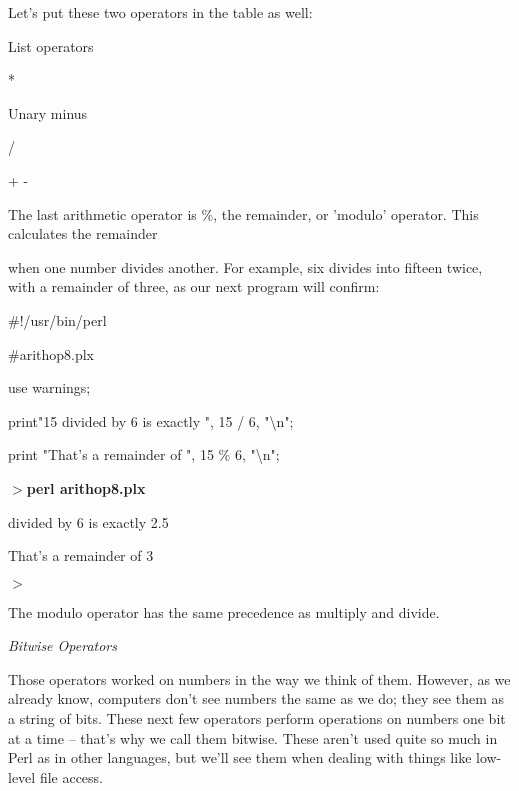 \documentclass[a4paper,11pt]{book}
\begin{document}
\noindent Let's put these two operators in the table as well:

\noindent 

\noindent 

\noindent List operators

\noindent 

\noindent **

\noindent 

\noindent Unary minus

\noindent 

\noindent * /

\noindent 

\noindent + -

\noindent 

\noindent 

\noindent The last arithmetic operator is \%, the remainder, or 'modulo' operator. This calculates the remainder

\noindent when one number divides another. For example, six divides into fifteen twice, with a remainder of three, as our next program will confirm:

\noindent 

\noindent 

\noindent \#!/usr/bin/perl

\noindent \#arithop8.plx

\noindent use warnings;

\noindent print"15 divided by 6 is exactly ", 15 / 6, "\textbackslash n";

\noindent print "That's a remainder of ", 15 \% 6, "\textbackslash n";

\noindent 

\noindent $>$\textbf{perl arithop8.plx}

 divided by 6 is exactly 2.5

\noindent That's a remainder of 3

\noindent $>$

\noindent 

\noindent The modulo operator has the same precedence as multiply and divide.

\noindent 

\noindent 

\noindent \textit{Bitwise Operators}

\noindent Those operators worked on numbers in the way we think of them. However, as we already know, computers don't see numbers the same as we do; they see them as a string of bits. These next few operators perform operations on numbers one bit at a time -- that's why we call them bitwise. These aren't used quite so much in Perl as in other languages, but we'll see them when dealing with things like low-level file access.
\end{document}
